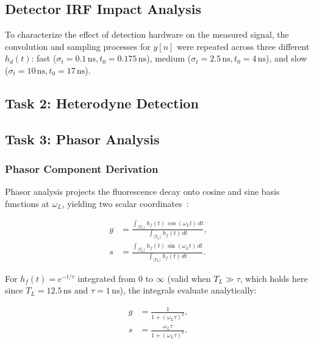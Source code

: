 \documentclass[conference]{IEEEtran}
\begin{document}
\subsection{Detector IRF Impact Analysis}
To characterize the effect of detection hardware on the measured signal,
the convolution and sampling processes for $y[n]$ were repeated across three different $h_d(t)$:
fast ($\sigma_t = 0.1\,\text{ns}, t_0=0.175\,\text{ns}$), medium ($\sigma_t = 2.5\,\text{ns}, t_0=4\,\text{ns}$), and slow ($\sigma_t = 10\,\text{ns}, t_0=17\,\text{ns}$).



\subsection{Task 2: Heterodyne Detection}



\subsection{Task 3: Phasor Analysis}

\subsubsection{Phasor Component Derivation}
\label{sec:phasor_deriv}

Phasor analysis projects the fluorescence decay onto cosine and sine
basis functions at $\omega_L$, yielding two scalar
coordinates~\cite{Digman2008}:

\begin{align}
    g &= \frac{\displaystyle\int_{\langle T_L \rangle}
               h_f(t)\,\cos(\omega_L t)\,dt}
              {\displaystyle\int_{\langle T_L \rangle}
               h_f(t)\,dt},
    \label{eq:g_def}
    \\[4pt]
    s &= \frac{\displaystyle\int_{\langle T_L \rangle}
               h_f(t)\,\sin(\omega_L t)\,dt}
              {\displaystyle\int_{\langle T_L \rangle}
               h_f(t)\,dt}.
    \label{eq:s_def}
\end{align}

For $h_f(t) = e^{-t/\tau}$ integrated from $0$ to $\infty$
(valid when $T_L \gg \tau$, which holds here since $T_L=12.5\,\text{ns}$
and $\tau=1\,\text{ns}$), the integrals evaluate analytically:

\begin{align}
    g &= \frac{1}{1 + (\omega_L\tau)^2},
    \label{eq:g_analytic} \\[4pt]
    s &= \frac{\omega_L\tau}{1 + (\omega_L\tau)^2}.
    \label{eq:s_analytic}
\end{align}
\end{document}
